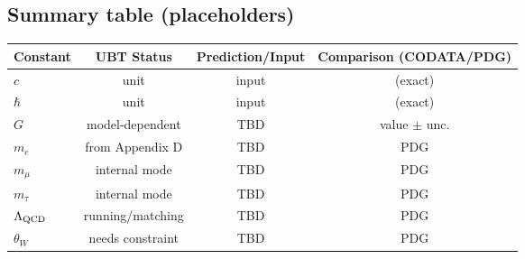 \subsection{Summary table (placeholders)}
\begin{center}
\begin{tabular}{lccc}
\hline
Constant & UBT Status & Prediction/Input & Comparison (CODATA/PDG)\\
\hline
$c$ & unit & input & (exact)\\
$\hbar$ & unit & input & (exact)\\
$G$ & model-dependent & TBD & value $\pm$ unc.\\
$m_e$ & from Appendix D & TBD & PDG\\
$m_\mu$ & internal mode & TBD & PDG\\
$m_\tau$ & internal mode & TBD & PDG\\
$\Lambda_{\rm QCD}$ & running/matching & TBD & PDG\\
$\theta_W$ & needs constraint & TBD & PDG\\
\hline
\end{tabular}
\end{center}